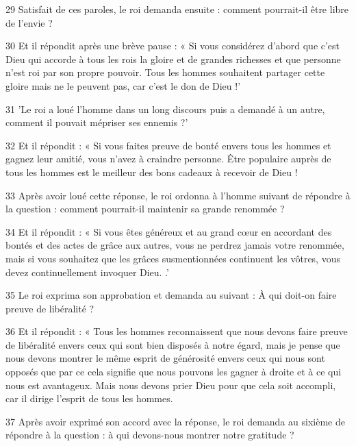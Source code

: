\par 29 Satisfait de ces paroles, le roi demanda ensuite : comment pourrait-il être libre de l'envie ?

\par 30 Et il répondit après une brève pause : « Si vous considérez d'abord que c'est Dieu qui accorde à tous les rois la gloire et de grandes richesses et que personne n'est roi par son propre pouvoir. Tous les hommes souhaitent partager cette gloire mais ne le peuvent pas, car c'est le don de Dieu !'

\par 31 'Le roi a loué l'homme dans un long discours puis a demandé à un autre, comment il pouvait mépriser ses ennemis ?'

\par 32 Et il répondit : « Si vous faites preuve de bonté envers tous les hommes et gagnez leur amitié, vous n'avez à craindre personne. Être populaire auprès de tous les hommes est le meilleur des bons cadeaux à recevoir de Dieu !

\par 33 Après avoir loué cette réponse, le roi ordonna à l'homme suivant de répondre à la question : comment pourrait-il maintenir sa grande renommée ?

\par 34 Et il répondit : « Si vous êtes généreux et au grand cœur en accordant des bontés et des actes de grâce aux autres, vous ne perdrez jamais votre renommée, mais si vous souhaitez que les grâces susmentionnées continuent les vôtres, vous devez continuellement invoquer Dieu. .'

\par 35 Le roi exprima son approbation et demanda au suivant : À qui doit-on faire preuve de libéralité ?

\par 36 Et il répondit : « Tous les hommes reconnaissent que nous devons faire preuve de libéralité envers ceux qui sont bien disposés à notre égard, mais je pense que nous devons montrer le même esprit de générosité envers ceux qui nous sont opposés que par ce cela signifie que nous pouvons les gagner à droite et à ce qui nous est avantageux. Mais nous devons prier Dieu pour que cela soit accompli, car il dirige l'esprit de tous les hommes.

\par 37 Après avoir exprimé son accord avec la réponse, le roi demanda au sixième de répondre à la question : à qui devons-nous montrer notre gratitude ?

